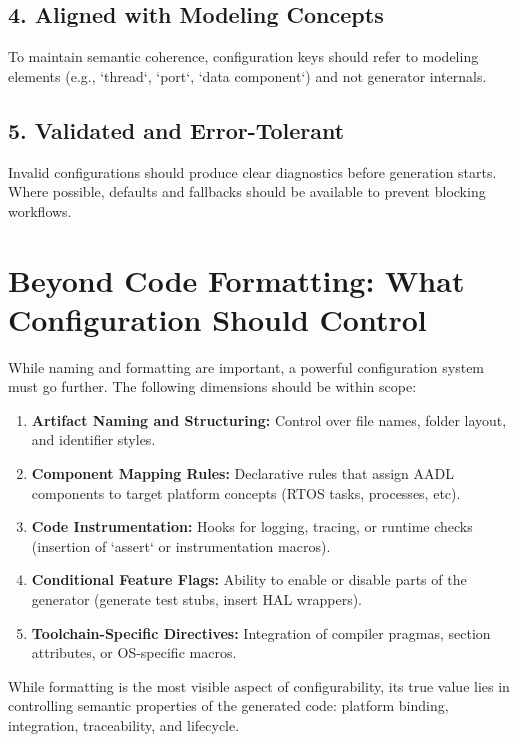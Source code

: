 \subsection*{4. Aligned with Modeling Concepts}

To maintain semantic coherence, configuration keys should refer to modeling elements (e.g., `thread`, `port`, `data component`) and not generator internals.

\subsection*{5. Validated and Error-Tolerant}

Invalid configurations should produce clear diagnostics before generation starts. Where possible, defaults and fallbacks should be available to prevent blocking workflows.

\section{Beyond Code Formatting: What Configuration Should Control}
\label{sec:config_scope}

While naming and formatting are important, a powerful configuration system must go further. The following dimensions should be within scope:

\begin{enumerate}
	\item \textbf{Artifact Naming and Structuring:} Control over file names, folder layout, and identifier styles.
	\item \textbf{Component Mapping Rules:} Declarative rules that assign AADL components to target platform concepts (RTOS tasks, processes, etc).
	\item \textbf{Code Instrumentation:} Hooks for logging, tracing, or runtime checks (insertion of `assert` or instrumentation macros).
	\item \textbf{Conditional Feature Flags:} Ability to enable or disable parts of the generator (generate test stubs, insert HAL wrappers).
	\item \textbf{Toolchain-Specific Directives:} Integration of compiler pragmas, section attributes, or OS-specific macros.
\end{enumerate}

\begin{tcolorbox}[colback=blue!5, colframe=blue!50!black, title=Configuration is More Than Style]
	While formatting is the most visible aspect of configurability, its true value lies in controlling semantic properties of the generated code: platform binding, integration, traceability, and lifecycle.
\end{tcolorbox}

